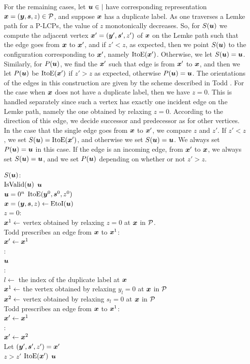 For the remaining cases, let $\uu\in \vert$ have corresponding representation
$\xx=(\yy,\ps,z)\in \CPol$, and suppose $\xx$ has a duplicate label. As one
traverses a Lemke path for a P-LCPs, the value of $z$ monotonically decreases.
So, for $S(\uu)$ we compute the adjacent vertex $\xx'=(\yy',\ps',z')$ of $\xx$
on the Lemke path such that the edge goes from $\xx$ to $\xx'$, and if $z'<z$,
as expected, then we point $S(\uu)$ to the configuration corresponding to $\xx'$, namely
$\ite(\xx')$. Otherwise, we let $S(\uu)=\uu$. Similarly, for $P(\uu)$, we find the
$\xx'$ such that edge is from $\xx'$ to $\xx$, and then we let $P(\uu)$ be
$\ite(\xx')$ if $z'>z$ as expected, otherwise $P(\uu)=\uu$. The orientations of the edges in this construction are given by the scheme described in Todd \cite{todd1976orientation}.
For the case when $\xx$ does not have a duplicate label, then we have $z=0$. This is
handled separately since such a vertex has exactly one incident edge on the Lemke
path, namely the one obtained by relaxing $z=0$. According to the direction of 
this edge, we decide successor and predecessor as for other vertices. In the case that the single edge goes from 
$\xx$ to $\xx'$, we compare $z$ and $z'$. If $z'<z$, we set $S(\uu)=\ite(\xx')$, and otherwise we set $S(\uu)=\uu$. We always set $P(\uu)=\uu$ in this case. If the edge is an incoming edge, from $\xx'$ to $\xx$, we
always set $S(\uu)=\uu$, and we set $P(\uu)$ depending on whether or not $z'>z$.

\begin{algo}
  \underline{$S(\uu)$}:\+
  \\\IfB \NotB $\isvalid(\uu)$ \ThenB \ReturnB $\uu$
  \\\IfB $\uu=0^n$ \ThenB \ReturnB $\ite(\yy^0,\ps^0,z^0)$
  \\$\xx=(\yy,\ps,z) \gets \eti(\uu)$
  \\\IfB $z=0$:\+
  \\  $\xx^1 \gets$ vertex obtained by relaxing $z=0$ at $\xx$ in $\CPol$. 
  \\  \IfB Todd \cite{todd1976orientation} prescribes an edge from $\xx$ to $\xx^1$:\+
  \\    $\xx'\gets \xx^1$\-
  \\  \ElseB:\+
  \\    \ReturnB $\uu$\-\-
  \\\ElseB:\+
  \\  $l\gets$ the index of the duplicate label at $\xx$
  \\  $\xx^1\gets$ the vertex obtained by relaxing $y_l=0$ at $\xx$ in $\CPol$ 
  \\  $\xx^2\gets$ vertex obtained by relaxing $s_l=0$ at $\xx$ in $\CPol$ 
  \\  \IfB Todd \cite{todd1976orientation} prescribes an edge from $\xx$ to $\xx^1$:\+
  \\    $\xx'\gets \xx^1$\-
  \\  \ElseB:\+
  \\    $\xx'\gets \xx^2$\-
  \\  Let $(\yy',\ps',z') = \xx'$
  \\  \IfB $z>z'$ \ThenB \ReturnB $\ite(\xx')$ \ElseB \ReturnB $\uu$
\end{algo}

